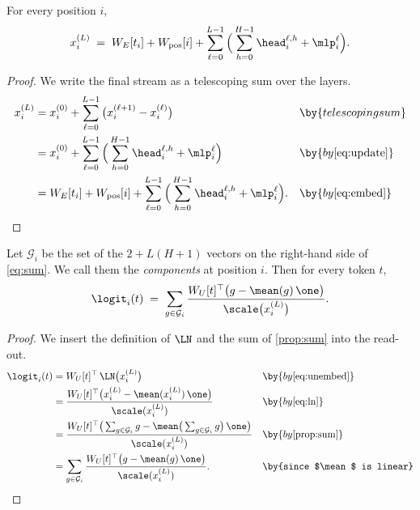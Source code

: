 \begin{proposition}\label{prop:sum}
For every position $i$,
\begin{equation}\label{eq:sum}
x_i^{(L)} \;=\; W_E[t_i]+W_{\mathrm{pos}}[i]+\sum_{\ell=0}^{L-1}\Big(\sum_{h=0}^{H-1}\head_i^{\ell,h}+\mlp_i^{\ell}\Big).
\end{equation}
\end{proposition}
\begin{proof}
We write the final stream as a telescoping sum over the layers.
\begin{align*}
x_i^{(L)} &= x_i^{(0)}+\sum_{\ell=0}^{L-1}\big(x_i^{(\ell+1)}-x_i^{(\ell)}\big) && \by{telescoping sum}\\
&= x_i^{(0)}+\sum_{\ell=0}^{L-1}\Big(\sum_{h=0}^{H-1}\head_i^{\ell,h}+\mlp_i^{\ell}\Big) && \by{by \eqref{eq:update}}\\
&= W_E[t_i]+W_{\mathrm{pos}}[i]+\sum_{\ell=0}^{L-1}\Big(\sum_{h=0}^{H-1}\head_i^{\ell,h}+\mlp_i^{\ell}\Big). && \by{by \eqref{eq:embed}}\qedhere
\end{align*}
\end{proof}

\begin{proposition}\label{prop:dla}
Let $\mathcal G_i$ be the set of the $2+L(H+1)$ vectors on the right-hand side of \eqref{eq:sum}. We call them
the \emph{components} at position $i$. Then for every token $t$,
\begin{equation}\label{eq:dla}
\logit_i(t) \;=\; \sum_{g\in\mathcal G_i}\frac{W_U[t]^\top\big(g-\mean(g)\,\one\big)}{\scale\big(x_i^{(L)}\big)} .
\end{equation}
\end{proposition}
\begin{proof}
We insert the definition of $\LN$ and the sum of \cref{prop:sum} into the read-out.
\begin{align*}
\logit_i(t) &= W_U[t]^\top\,\LN\big(x_i^{(L)}\big) && \by{by \eqref{eq:unembed}}\\
&= \frac{W_U[t]^\top\big(x_i^{(L)}-\mean(x_i^{(L)})\,\one\big)}{\scale(x_i^{(L)})} && \by{by \eqref{eq:ln}}\\
&= \frac{W_U[t]^\top\big(\sum_{g\in\mathcal G_i}g-\mean\big(\sum_{g\in\mathcal G_i}g\big)\,\one\big)}{\scale(x_i^{(L)})} && \by{by \cref{prop:sum}}\\
&= \sum_{g\in\mathcal G_i}\frac{W_U[t]^\top\big(g-\mean(g)\,\one\big)}{\scale(x_i^{(L)})}. && \by{since $\mean$ is linear}\qedhere
\end{align*}
\end{proof}

